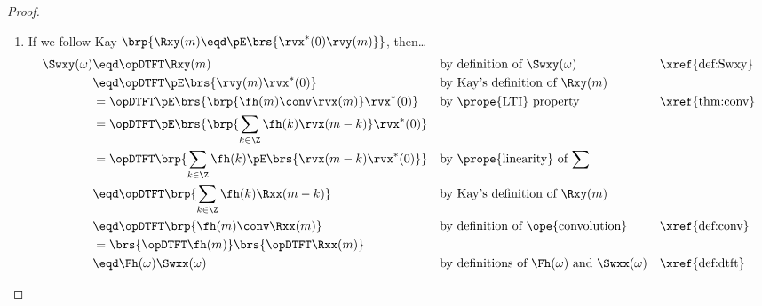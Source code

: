 \begin{proof}
\begin{enumerate}
\item If we follow Kay $\brp{\Rxy(m)\eqd\pE\brs{\rvx^\ast(0)\rvy(m)}}$, then\ldots
  \begin{align*}
    \Swxy(\omega)
      &\eqd \opDTFT\Rxy(m)
      && \text{by definition of $\Swxy(\omega)$}
      && \text{\xref{def:Swxy}}
    \\&\eqd \opDTFT\pE\brs{\rvy(m)\rvx^\ast(0)}
      && \text{by Kay's definition of $\Rxy(m)$}
    \\&=    \opDTFT\pE\brs{\brp{\fh(m)\conv\rvx(m)}\rvx^\ast(0)}
      && \text{by \prope{LTI} property}
      && \text{\xref{thm:conv}}
    \\&=    \opDTFT\pE\brs{\brp{\sum_{k\in\Z} \fh(k)\rvx(m-k)}\rvx^\ast(0)}
    \\&=    \opDTFT\brp{\sum_{k\in\Z} \fh(k)\pE\brs{\rvx(m-k)\rvx^\ast(0)}}
      && \text{by \prope{linearity} of $\sum$}
    \\&\eqd \opDTFT\brp{\sum_{k\in\Z} \fh(k)\Rxx(m-k)}
      && \text{by Kay's definition of $\Rxy(m)$}
    \\&\eqd \opDTFT\brp{\fh(m)\conv\Rxx(m)}
      && \text{by definition of \ope{convolution}}
      && \text{\xref{def:conv}}
    \\&=    \brs{\opDTFT\fh(m)}\brs{\opDTFT\Rxx(m)}
    \\&\eqd \Fh(\omega) \Swxx(\omega)
      && \text{by definitions of $\Fh(\omega)$ and $\Swxx(\omega)$}
      && \text{\xref{def:dtft}}
  \end{align*}


\end{enumerate}
\end{proof}
